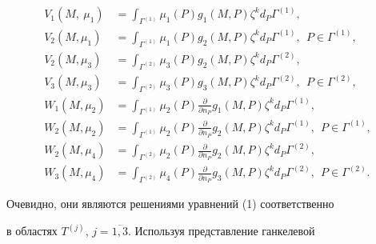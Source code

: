 \begin{align*}


V_1(M,\ \mu_1)&=\int_{\Gamma^{(1)}}


\mu_1(P)g_1(M, P)\zeta^k d_P\Gamma^{(1)}, \\


%


V_2(M, \mu_1)&=\int _{\Gamma^{(1)}}


\mu_1(P)g_2(M, P)\zeta^k d_P\Gamma^{(1)},\ \ P\in \Gamma^{(1)}, \\


%


V_2(M, \mu_3)&=\int _{\Gamma^{(2)}}


\mu_3(P)g_2(M, P)\zeta^k d_P\Gamma^{(2)}, \\


%


V_3(M, \mu_3)&=\int _{\Gamma^{(2)}}


\mu_3(P)g_3(M, P)\zeta^k d_P\Gamma^{(2)},\ \ P\in \Gamma^{(2)}, \\


%


W_1(M, \mu_2)&=\int _{\Gamma^{(1)}}


\mu_2(P)\frac{\partial }{\partial n_P}g_1(M, P)\zeta^k d_P\Gamma^{(1)},\\


%


W_2(M, \mu_2)&=\int _{\Gamma^{(1)}}


\mu_2(P)\frac{\partial }{\partial n_P}g_2(M, P)\zeta^k d_P\Gamma^{(1)},


\ \ P\in \Gamma^{(1)},\\


%


W_2(M, \mu_4)&=\int _{\Gamma^{(2)}}


\mu_2(P)\frac{\partial }{\partial n_P}g_2(M, P)\zeta^k d_P\Gamma^{(2)},\\


%


W_3(M, \mu_4)&=\int _{\Gamma^{(2)}}


\mu_4(P)\frac{\partial }{\partial n_P}g_3(M, P)\zeta^k d_P\Gamma^{(2)},


\ \ P\in \Gamma^{(2)}.


\end{align*}


Очевидно, они являются решениями уравнений (1) соответственно 


в областях $T^{(j)}$, $j=\overline{1,3}$. Используя представление ганкелевой 


